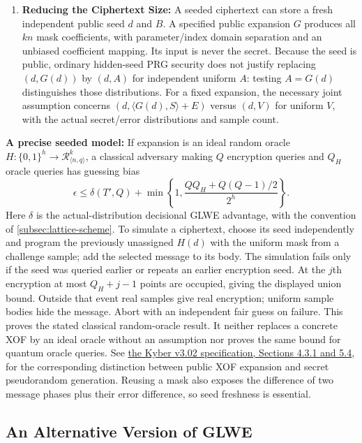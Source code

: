 \begin{enumerate}
\item \textbf{Reducing the Ciphertext Size:} A seeded ciphertext can store a fresh independent public seed $d$ and $B$. A specified public expansion $G$ produces all $kn$ mask coefficients, with parameter/index domain separation and an unbiased coefficient mapping. Its input is never the secret. Because the seed is public, ordinary hidden-seed PRG security does not justify replacing $(d,G(d))$ by $(d,A)$ for independent uniform $A$: testing $A=G(d)$ distinguishes those distributions. For a fixed expansion, the necessary joint assumption concerns $(d,\langle G(d),S\rangle+E)$ versus $(d,V)$ for uniform $V$, with the actual secret/error distributions and sample count.
\end{enumerate}

\noindent\textbf{A precise seeded model:} If expansion is an ideal random oracle $H:\{0,1\}^h\to\mathcal R_{\langle n,q\rangle}^k$, a classical adversary making $Q$ encryption queries and $Q_H$ oracle queries has guessing bias
\[
\epsilon\le\delta(T',Q)+\min\left\{1,\frac{QQ_H+Q(Q-1)/2}{2^h}\right\}.
\]
Here $\delta$ is the actual-distribution decisional GLWE advantage, with the convention of \autoref{subsec:lattice-scheme}. To simulate a ciphertext, choose its seed independently and program the previously unassigned $H(d)$ with the uniform mask from a challenge sample; add the selected message to its body. The simulation fails only if the seed was queried earlier or repeats an earlier encryption seed. At the $j$th encryption at most $Q_H+j-1$ points are occupied, giving the displayed union bound. Outside that event real samples give real encryption; uniform sample bodies hide the message. Abort with an independent fair guess on failure. This proves the stated classical random-oracle result. It neither replaces a concrete XOF by an ideal oracle without an assumption nor proves the same bound for quantum oracle queries. See \href{https://pq-crystals.org/kyber/data/kyber-specification-round3-20210804.pdf}{the Kyber v3.02 specification, Sections 4.3.1 and 5.4}, for the corresponding distinction between public XOF expansion and secret pseudorandom generation. Reusing a mask also exposes the difference of two message phases plus their error difference, so seed freshness is essential.

\subsection{An Alternative Version of GLWE}
\label{subsec:glwe-alternative}

